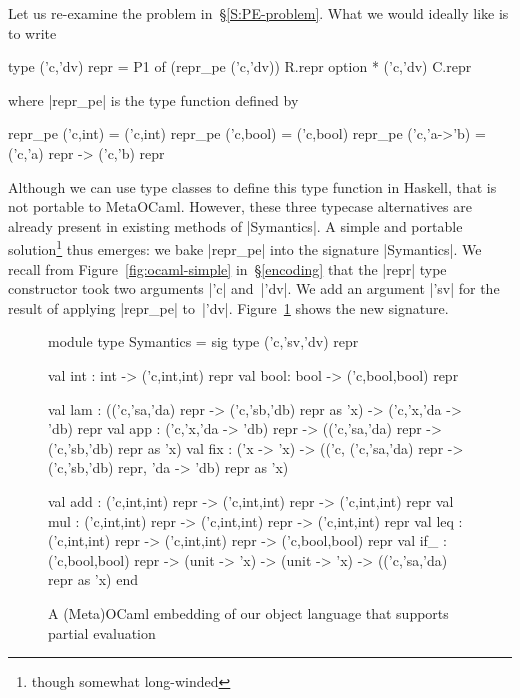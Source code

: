 Let us re-examine the problem in~\S\ref{S:PE-problem}. What we
would ideally like is to write
\begin{code}
type ('c,'dv) repr = P1 of (repr_pe ('c,'dv)) R.repr option * ('c,'dv) C.repr
\end{code}
where |repr_pe| is the type function defined
by
\begin{code}
repr_pe ('c,int)    = ('c,int)
repr_pe ('c,bool)   = ('c,bool)
repr_pe ('c,'a->'b) = ('c,'a) repr -> ('c,'b) repr
\end{code}
Although we can use type classes to define this type function
in Haskell, that is not portable to MetaOCaml. However,
these three typecase alternatives are already present in existing
methods of |Symantics|.
A simple and portable solution\footnote{though somewhat long-winded} thus
emerges: we bake |repr_pe| into the signature |Symantics|. 
We recall from Figure~\ref{fig:ocaml-simple} in~\S\ref{encoding} that 
the |repr| type constructor took two arguments |'c| and~|'dv|.
We add an argument |'sv| for the result of applying |repr_pe| to~|'dv|.
Figure~\ref{fig:ocaml} shows the new signature.
\begin{figure}
\begin{floatrule}
\begin{code2}
module type Symantics = sig
  type ('c,'sv,'dv) repr

  val int : int  -> ('c,int,int) repr
  val bool: bool -> ('c,bool,bool) repr

  val lam : (('c,'sa,'da) repr -> ('c,'sb,'db) repr as 'x)
            -> ('c,'x,'da -> 'db) repr
  val app : ('c,'x,'da -> 'db) repr
            -> (('c,'sa,'da) repr -> ('c,'sb,'db) repr as 'x)
  val fix : ('x -> 'x) -> (('c, ('c,'sa,'da) repr -> ('c,'sb,'db) repr,
                                'da -> 'db) repr as 'x)

  val add : ('c,int,int) repr -> ('c,int,int) repr -> ('c,int,int) repr
  val mul : ('c,int,int) repr -> ('c,int,int) repr -> ('c,int,int) repr
  val leq : ('c,int,int) repr -> ('c,int,int) repr -> ('c,bool,bool) repr
  val if_ : ('c,bool,bool) repr
            -> (unit -> 'x) -> (unit -> 'x) -> (('c,'sa,'da) repr as 'x)
end
\end{code2}
\end{floatrule}
\caption{A (Meta)OCaml embedding of our object language that supports
  partial evaluation}
\label{fig:ocaml}
\end{figure}

